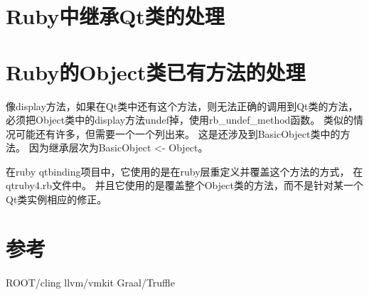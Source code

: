 \section{Ruby中继承Qt类的处理}

\section{Ruby的Object类已有方法的处理}
像display方法，如果在Qt类中还有这个方法，则无法正确的调用到Qt类的方法，
必须把Object类中的display方法undef掉，使用rb\_undef\_method函数。
类似的情况可能还有许多，但需要一个一个列出来。
这是还涉及到BasicObject类中的方法。
因为继承层次为BasicObject <- Object。

在ruby qtbinding项目中，它使用的是在ruby层重定义并覆盖这个方法的方式，
在qtruby4.rb文件中。
并且它使用的是覆盖整个Object类的方法，而不是针对某一个Qt类实例相应的修正。


\section{参考}
ROOT/cling
llvm/vmkit
Graal/Truffle

